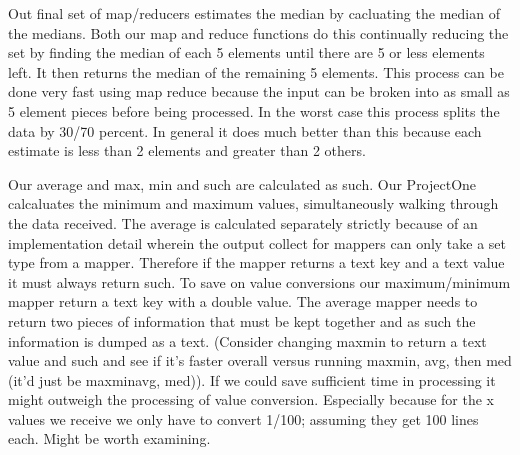 \documentclass[11pt]{article}
\begin{document}
Out final set of map/reducers estimates the median by cacluating the median of the medians.  Both our map and reduce functions do this continually reducing the set by finding the median of each 5 elements until there are 5 or less elements left.  It then returns the median of the remaining 5 elements.  This process can be done very fast using map reduce because the input can be broken into as small as 5 element pieces before being processed.  In the worst case this process splits the data by 30/70 percent.  In general it does much better than this because each estimate is less than 2 elements and greater than 2 others.  



Our average and max, min and such are calculated as such.  Our ProjectOne calcaluates the minimum and maximum values, simultaneously walking through the data received.  The average is calculated separately strictly because of an implementation detail wherein the output collect for mappers can only take a set type from a mapper.  Therefore if the mapper returns a text key and a text value it must always return such.  To save on value conversions our maximum/minimum mapper return a text key with a double value.  The average mapper needs to return two pieces of information that must be kept together and as such the information is dumped as a text.
  (Consider changing maxmin to return a text value and such and see if it's faster overall versus running maxmin, avg, then med (it'd just be maxminavg, med)).  If we could save sufficient time in processing it might outweigh the processing of value conversion.  Especially because for the x values we receive we only have to convert 1/100; assuming they get 100 lines each.  Might be worth examining.
\end{document}
